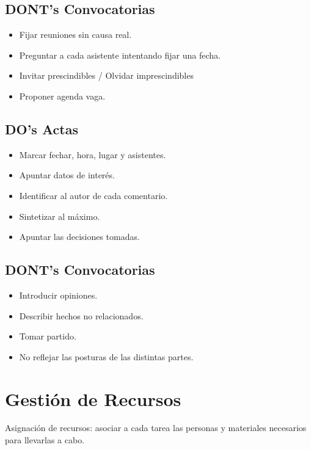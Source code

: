 \documentclass{article}
\begin{document}
\subsection{DONT's Convocatorias}
\begin{itemize}
	\item Fijar reuniones sin causa real.
	\item Preguntar a cada asistente intentando fijar una fecha.
	\item Invitar prescindibles / Olvidar imprescindibles
	\item Proponer agenda vaga.
\end{itemize}
\subsection{DO's Actas}
\begin{itemize}
	\item Marcar fechar, hora, lugar y asistentes.
	\item Apuntar datos de interés.
	\item Identificar al autor de cada comentario.
	\item Sintetizar al máximo.
	\item Apuntar las decisiones tomadas.
\end{itemize}
\subsection{DONT's Convocatorias}
\begin{itemize}
	\item Introducir opiniones.
	\item Describir hechos no relacionados.
	\item Tomar partido.
	\item No reflejar las posturas de las distintas partes.
\end{itemize}

\section{Gestión de Recursos}
\begin{theorem}
Asignación de recursos: asociar a cada tarea las personas y materiales necesarios para llevarlas a cabo.
\end{theorem}
\end{document}
